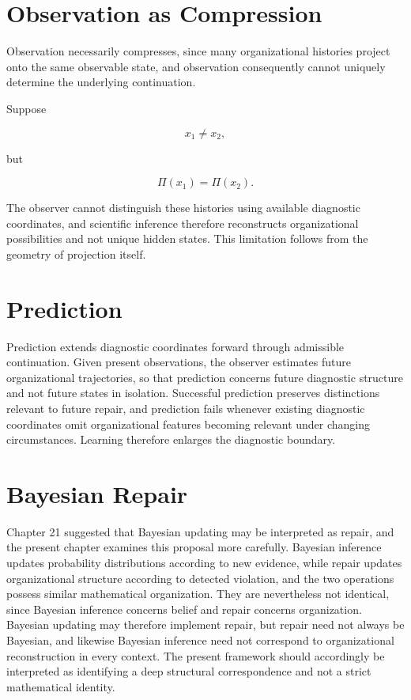 \documentclass[11pt,oneside]{book}
\numberwithin{equation}{chapter}
\theoremstyle{definition}
\theoremstyle{plain}
\begin{document}
\section{Observation as Compression}

Observation necessarily compresses, since many organizational histories project onto the same observable state, and observation consequently cannot uniquely determine the underlying continuation.

Suppose

\[
x_1
\neq
x_2,
\]

but

\[
\Pi(x_1)
=
\Pi(x_2).
\]

The observer cannot distinguish these histories using available diagnostic coordinates, and scientific inference therefore reconstructs organizational possibilities and not unique hidden states. This limitation follows from the geometry of projection itself.

\section{Prediction}

Prediction extends diagnostic coordinates forward through admissible continuation. Given present observations, the observer estimates future organizational trajectories, so that prediction concerns future diagnostic structure and not future states in isolation. Successful prediction preserves distinctions relevant to future repair, and prediction fails whenever existing diagnostic coordinates omit organizational features becoming relevant under changing circumstances. Learning therefore enlarges the diagnostic boundary.

\section{Bayesian Repair}

Chapter 21 suggested that Bayesian updating may be interpreted as repair, and the present chapter examines this proposal more carefully. Bayesian inference updates probability distributions according to new evidence, while repair updates organizational structure according to detected violation, and the two operations possess similar mathematical organization. They are nevertheless not identical, since Bayesian inference concerns belief and repair concerns organization. Bayesian updating may therefore implement repair, but repair need not always be Bayesian, and likewise Bayesian inference need not correspond to organizational reconstruction in every context. The present framework should accordingly be interpreted as identifying a deep structural correspondence and not a strict mathematical identity.
\end{document}
